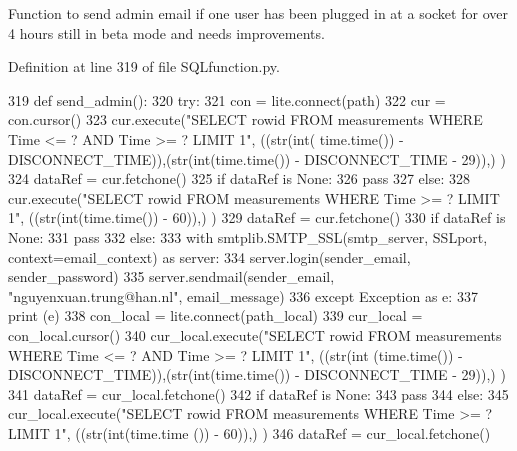 Function to send admin email if one user has been plugged in at a socket for over 4 hours still in beta mode and needs improvements. 



Definition at line 319 of file S\+Q\+Lfunction.\+py.


\begin{DoxyCode}
319 \textcolor{keyword}{def }send_admin():
320     \textcolor{keywordflow}{try}:
321         con = lite.connect(path)
322         cur = con.cursor()
323         cur.execute(\textcolor{stringliteral}{"SELECT rowid FROM measurements WHERE Time <= ? AND Time >= ? LIMIT 1"}, ((str(int(
      time.time()) - DISCONNECT\_TIME)),(str(int(time.time()) - DISCONNECT\_TIME - 29)),) )
324         dataRef = cur.fetchone()
325         \textcolor{keywordflow}{if} dataRef \textcolor{keywordflow}{is} \textcolor{keywordtype}{None}:
326             \textcolor{keywordflow}{pass}
327         \textcolor{keywordflow}{else}:
328             cur.execute(\textcolor{stringliteral}{"SELECT rowid FROM measurements WHERE Time >= ? LIMIT 1"}, ((str(int(time.time()) - 
      60)),) )
329             dataRef = cur.fetchone()
330             \textcolor{keywordflow}{if} dataRef \textcolor{keywordflow}{is} \textcolor{keywordtype}{None}:
331                 \textcolor{keywordflow}{pass}
332             \textcolor{keywordflow}{else}:
333                 with smtplib.SMTP\_SSL(smtp\_server, SSLport, context=email\_context) \textcolor{keyword}{as} server:
334                     server.login(sender\_email, sender\_password)                    
335                     server.sendmail(sender\_email, \textcolor{stringliteral}{"nguyenxuan.trung@han.nl"}, email\_message)
336     \textcolor{keywordflow}{except} Exception \textcolor{keyword}{as} e:
337         \textcolor{keywordflow}{print} (e)
338         con\_local = lite.connect(path\_local)
339         cur\_local = con\_local.cursor()
340         cur\_local.execute(\textcolor{stringliteral}{"SELECT rowid FROM measurements WHERE Time <= ? AND Time >= ? LIMIT 1"}, ((str(int
      (time.time()) - DISCONNECT\_TIME)),(str(int(time.time()) - DISCONNECT\_TIME - 29)),) )
341         dataRef = cur\_local.fetchone()
342         \textcolor{keywordflow}{if} dataRef \textcolor{keywordflow}{is} \textcolor{keywordtype}{None}:
343             \textcolor{keywordflow}{pass}
344         \textcolor{keywordflow}{else}:
345             cur\_local.execute(\textcolor{stringliteral}{"SELECT rowid FROM measurements WHERE Time >= ? LIMIT 1"}, ((str(int(time.time
      ()) - 60)),) )
346             dataRef = cur\_local.fetchone()

\end{DoxyCode}
